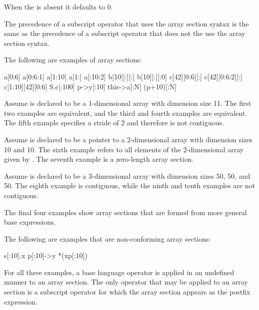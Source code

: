 \begin{ccppspecific}
When the  is absent it defaults to 0.

The precedence of a subscript operator that uses the array section syntax is
the same as the precedence of a subscript operator that does not the use the
array section syntax.


\begin{note}
The following are examples of array sections:

\begin{indentedcodelist}
a[0:6]
a[0:6:1]
a[1:10]
a[1:]
a[:10:2]
b[10][:][:]
b[10][:][:0]
c[42][0:6][:]
c[42][0:6:2][:]
c[1:10][42][0:6]
S.c[:100]
p->y[:10]
this->a[:N]
(p+10)[:N]
\end{indentedcodelist}

Assume  is declared to be a 1-dimensional array with dimension size
11.  The first two examples are equivalent, and the third and fourth
examples are equivalent. The fifth example specifies a stride of 2 and
therefore is not contiguous.

Assume  is declared to be a pointer to a 2-dimensional array with
dimension sizes 10 and 10. The sixth example refers to all elements of the
2-dimensional array given by . The seventh
example is a zero-length array section.

Assume  is declared to be a 3-dimensional array with dimension sizes
50, 50, and 50.  The eighth example is contiguous, while the ninth and
tenth examples are not contiguous.

The final four examples show array sections that are formed from
more general base expressions.

The following are examples that are non-conforming array sections:

\begin{indentedcodelist}
s[:10].x
p[:10]->y
*(xp[:10])
\end{indentedcodelist}

For all three examples, a base language operator is applied in an undefined
manner to an array section. The only operator that may be applied to an array
section is a subscript operator for which the array section appears as the
postfix expression.
\end{note}
\medskip
\end{ccppspecific}

